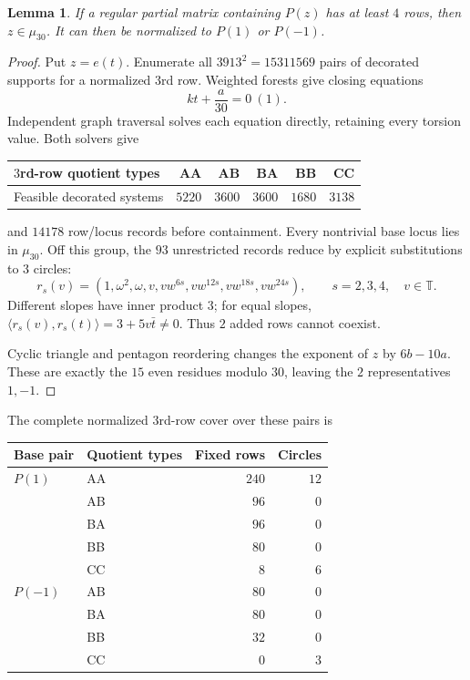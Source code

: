 \documentclass[11pt,a4paper]{article}
\newtheorem{lemma}[theorem]{Lemma}
\theoremstyle{plain}
\theoremstyle{definition}
\numberwithin{equation}{section}
\begin{document}
\begin{lemma}\label{lem:Cmu30}\label{lem:Csigns}
If a regular partial matrix containing $P(z)$ has at least $4$ rows, then $z\in\mu_{30}$. It can then be normalized to $P(1)$ or $P(-1)$.
\end{lemma}
\begin{proof}
Put $z=e(t)$. Enumerate all $3913^2=15311569$ pairs of decorated supports for a normalized $3$rd row. Weighted forests give closing equations
\begin{equation}\label{eq:Cbasecongruence}
kt+\frac{a}{30}=0\ (1).
\end{equation}
Independent graph traversal solves each equation directly, retaining every torsion value. Both solvers give
\begin{center}\begin{tabular}{lrrrrr}\toprule
$3$rd-row quotient types&AA&AB&BA&BB&CC\\\midrule
Feasible decorated systems&$5220$&$3600$&$3600$&$1680$&$3138$\\\bottomrule
\end{tabular}\end{center}
and $14178$ row/locus records before containment. Every nontrivial base locus lies in $\mu_{30}$. Off this group, the $93$ unrestricted records reduce by explicit substitutions to $3$ circles:
\begin{equation}\label{eq:Cgenericcircles}
r_s(v)=(1,\omega^2,\omega,v,vw^{6s},vw^{12s},
vw^{18s},vw^{24s}),\qquad s=2,3,4,\quad v\in\mathbb{T}.
\end{equation}
Different slopes have inner product $3$; for equal slopes, $\langle r_s(v),r_s(t)\rangle=3+5v\bar{t}\ne0$. Thus $2$ added rows cannot coexist.

Cyclic triangle and pentagon reordering changes the exponent of $z$ by $6b-10a$. These are exactly the $15$ even residues modulo $30$, leaving the $2$ representatives $1,-1$.
\end{proof}
The complete normalized $3$rd-row cover over these pairs is
\begin{center}\begin{tabular}{llrr}\toprule
Base pair&Quotient types&Fixed rows&Circles\\\midrule
$P(1)$&AA&$240$&$12$\\
&AB&$96$&$0$\\
&BA&$96$&$0$\\
&BB&$80$&$0$\\
&CC&$8$&$6$\\\midrule
$P(-1)$&AB&$80$&$0$\\
&BA&$80$&$0$\\
&BB&$32$&$0$\\
&CC&$0$&$3$\\\bottomrule
\end{tabular}\end{center}
\end{document}
